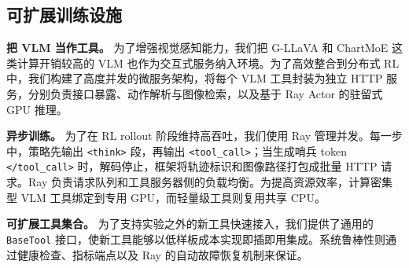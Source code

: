 \subsection{可扩展训练设施} \label{sec:4.3}
\noindent \textbf{把 VLM 当作工具。}
为了增强视觉感知能力，我们把 G-LLaVA 和 ChartMoE 这类计算开销较高的 VLM 也作为交互式服务纳入环境。为了高效整合到分布式 RL 中，我们构建了高度并发的微服务架构，将每个 VLM 工具封装为独立 HTTP 服务，分别负责接口暴露、动作解析与图像检索，以及基于 Ray Actor 的驻留式 GPU 推理。

\noindent \textbf{异步训练。}
为了在 RL rollout 阶段维持高吞吐，我们使用 Ray 管理并发。每一步中，策略先输出 \texttt{<think>} 段，再输出 \texttt{<tool\_call>}；当生成哨兵 token \texttt{</tool\_call>} 时，解码停止，框架将轨迹标识和图像路径打包成批量 HTTP 请求。Ray 负责请求队列和工具服务器侧的负载均衡。为提高资源效率，计算密集型 VLM 工具绑定到专用 GPU，而轻量级工具则复用共享 CPU。

\noindent \textbf{可扩展工具集合。}
为了支持实验之外的新工具快速接入，我们提供了通用的 \texttt{BaseTool} 接口，使新工具能够以低样板成本实现即插即用集成。系统鲁棒性则通过健康检查、指标端点以及 Ray 的自动故障恢复机制来保证。
